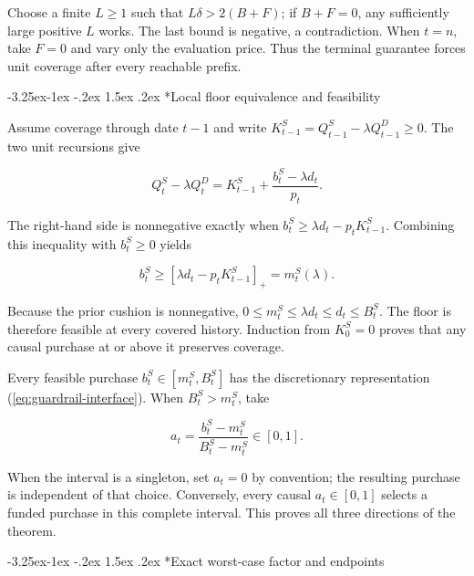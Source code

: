 \documentclass[12pt,a4paper,oneside]{report}
\makeatletter
\renewcommand\subsection{\@startsection{subsection}{2}{\z@}%
  {-3.25ex\@plus -1ex \@minus -.2ex}%
  {1.5ex \@plus .2ex}%
  {\normalfont\fontsize{12}{15}\selectfont\bfseries}}
\makeatother
\begin{document}
Choose a finite $L\geq1$ such that $L\delta>2(B+F)$; if $B+F=0$, any
sufficiently large positive $L$ works. The last bound is negative, a
contradiction. When $t=n$, take $F=0$ and vary only the evaluation price. Thus
the terminal guarantee forces unit coverage after every reachable prefix.

\subsection*{Local floor equivalence and feasibility}

Assume coverage through date $t-1$ and write
$K_{t-1}^S=Q_{t-1}^S-\lambda Q_{t-1}^D\geq0$. The two unit recursions give

\begin{equation}
  Q_t^S-\lambda Q_t^D
  =K_{t-1}^S+\frac{b_t^S-\lambda d_t}{p_t}.
  \label{eq:appendix-coverage-update}
\end{equation}

The right-hand side is nonnegative exactly when
$b_t^S\geq\lambda d_t-p_tK_{t-1}^S$. Combining this inequality with
$b_t^S\geq0$ yields

\begin{equation}
  b_t^S\geq\left[\lambda d_t-p_tK_{t-1}^S\right]_+
  =m_t^S(\lambda).
  \label{eq:proof-local-floor}
\end{equation}

Because the prior cushion is nonnegative,
$0\leq m_t^S\leq\lambda d_t\leq d_t\leq B_t^S$. The floor is therefore
feasible at every covered history. Induction from $K_0^S=0$ proves that any
causal purchase at or above it preserves coverage.

Every feasible purchase $b_t^S\in[m_t^S,B_t^S]$ has the discretionary
representation (\ref{eq:guardrail-interface}). When $B_t^S>m_t^S$, take

\begin{equation}
  a_t=\frac{b_t^S-m_t^S}{B_t^S-m_t^S}\in[0,1].
  \label{eq:proof-selector-recovery}
\end{equation}

When the interval is a singleton, set $a_t=0$ by convention; the resulting
purchase is independent of that choice. Conversely, every causal
$a_t\in[0,1]$ selects a funded purchase in this complete interval. This proves
all three directions of the theorem.

\subsection*{Exact worst-case factor and endpoints}
\end{document}
